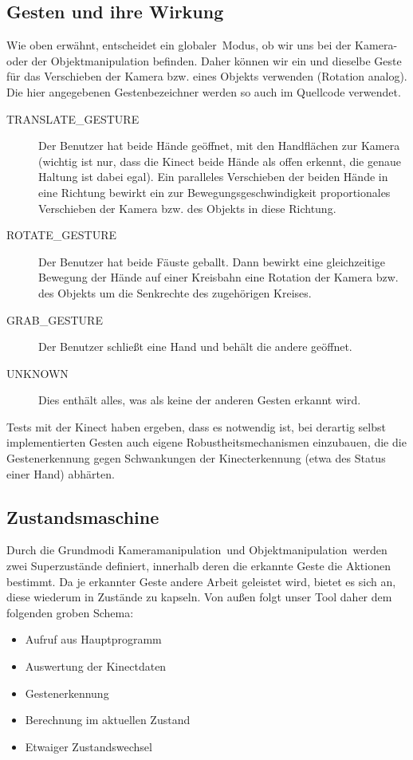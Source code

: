 \documentclass[11pt,a4paper]{scrartcl}
\begin{document}
	\subsection{Gesten und ihre Wirkung}
	Wie oben erwähnt, entscheidet ein \glqq globaler\grqq\ Modus, ob wir uns bei der Kamera- oder der Objektmanipulation befinden. Daher können wir ein und dieselbe Geste für das Verschieben der Kamera bzw. eines Objekts verwenden (Rotation analog). Die hier angegebenen Gestenbezeichner werden so auch im Quellcode verwendet.
	\begin{description}
		\item[TRANSLATE\_GESTURE] Der Benutzer hat beide Hände geöffnet, mit den Handflächen zur Kamera (wichtig ist nur, dass die Kinect beide Hände als offen erkennt, die genaue Haltung ist dabei egal). Ein paralleles Verschieben der beiden Hände in eine Richtung bewirkt ein zur Bewegungsgeschwindigkeit proportionales Verschieben der Kamera bzw. des Objekts in diese Richtung.
		\item[ROTATE\_GESTURE] Der Benutzer hat beide Fäuste geballt. Dann bewirkt eine gleichzeitige Bewegung der Hände auf einer Kreisbahn eine Rotation der Kamera bzw. des Objekts um die Senkrechte des zugehörigen Kreises.
		\item[GRAB\_GESTURE] Der Benutzer schließt eine Hand und behält die andere geöffnet.
		\item[UNKNOWN] Dies enthält alles, was als keine der anderen Gesten erkannt wird.
	\end{description}
	Tests mit der Kinect haben ergeben, dass es notwendig ist, bei derartig selbst implementierten Gesten auch eigene Robustheitsmechanismen einzubauen, die die Gestenerkennung gegen Schwankungen der Kinecterkennung (etwa des Status einer Hand) abhärten.
	\subsection{Zustandsmaschine}
	Durch die Grundmodi \glqq Kameramanipulation\grqq~und \glqq Objektmanipulation\grqq~werden zwei Superzustände definiert, innerhalb deren die erkannte Geste die Aktionen bestimmt. Da je erkannter Geste andere Arbeit geleistet wird, bietet es sich an, diese wiederum in Zustände zu kapseln. Von außen folgt unser Tool daher dem folgenden groben Schema:
	\begin{itemize}
	\item Aufruf aus Hauptprogramm
	\item Auswertung der Kinectdaten
	\item Gestenerkennung
	\item Berechnung im aktuellen Zustand
	\item Etwaiger Zustandswechsel
	\end{itemize}
\end{document}

